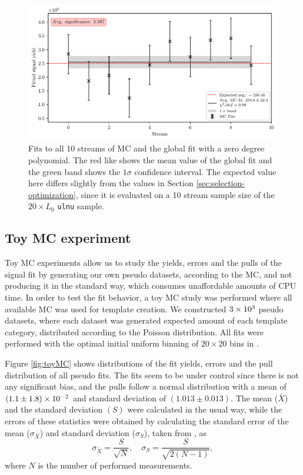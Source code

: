\begin{figure}[H]
	\centering
	\captionsetup{width=0.8\linewidth}
	\includegraphics[width=\linewidth]{fig/sig_global}
	\caption{Fits to all 10 streams of MC and the global fit with a zero degree polynomial. The red like shows the mean value of the global fit and the green band shows the $1\sigma$ confidence interval. The expected value here differs slightly from the values in Section \ref{sec:selection-optimization}, since it is evaluated on a 10 stream sample size of the $20\times L_0$ \texttt{ulnu} sample.}
	\label{fig:sig_global}
\end{figure}

\subsection{Toy MC experiment}

Toy MC experiments allow us to study the yields, errors and the pulls of the signal fit by generating our own pseudo datasets, according to the MC, and not producing it in the standard way, which consumes unaffordable amounts of CPU time. In order to test the fit behavior, a toy MC study was performed where all available MC was used for template creation. We constructed $3\times 10^{3}$ pseudo datasets, where each dataset was generated expected amount of each template category, distributed according to the Poisson distribution. All fits were performed with the optimal initial uniform binning of $20\times20$ bins in \vars.

Figure \ref{fig:toyMC} shows distributions of the fit yields, errors and the pull distribution of all pseudo fits. The fits seem to be under control since there is not any significant bias, and the pulls follow a normal distribution with a mean of $(1.1\pm1.8)\times 10^{-2}$ and standard deviation of $(1.013\pm0.013)$. The mean ($\bar X$) and the standard deviation $(S)$ were calculated in the usual way, while the errors of these statistics were obtained by calculating the standard error of the mean ($\sigma_{\bar X}$) and standard deviation ($\sigma_S$), taken from \cite{ahn2003standard}, as
\begin{equation}
\sigma_{\bar X} = \frac{S}{\sqrt{N}},\quad \sigma_{S} = \frac{S}{\sqrt{2(N-1)}},
\end{equation}
where $N$ is the number of performed measurements.


